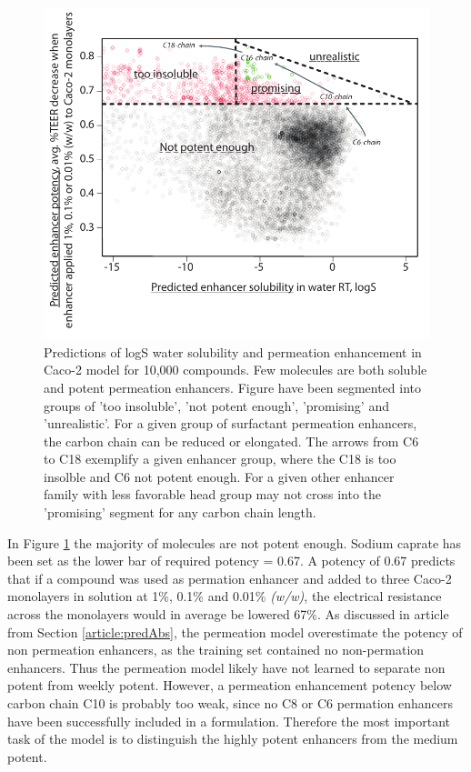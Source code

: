 \begin{figure}[!htbp]
\includegraphics[width=\textwidth,height=\textheight,keepaspectratio]{graphics/screened_molecules3.pdf}
\caption{Predictions of logS water solubility and permeation enhancement in Caco-2 model for 10,000 compounds. Few molecules are both soluble and potent permeation enhancers. Figure have been segmented into groups of 'too insoluble', 'not potent enough', 'promising' and 'unrealistic'. For a given group of surfactant permeation enhancers, the carbon chain can be reduced or elongated. The arrows from C6 to C18 exemplify a given enhancer group, where the C18 is too insolble and C6 not potent enough. For a given other enhancer family with less favorable head group may not cross into the 'promising' segment for any carbon chain length.}
\label{predictionsCombined}
\end{figure}

In Figure \ref{predictionsCombined} the majority of molecules are not potent enough. Sodium caprate has been set as the lower bar of required potency = 0.67. A potency of 0.67 predicts that if a compound was used as permation enhancer and added to three Caco-2 monolayers in solution at 1\%, 0.1\% and 0.01\% \textit{(w/w)}, the electrical resistance across the monolayers would in average be lowered 67\%. As discussed in article from Section \ref{article:predAbs}, the permeation model overestimate the potency of non permeation enhancers, as the training set contained no non-permation enhancers. Thus the permeation model likely have not learned to separate non potent from weekly potent. However, a permeation enhancement potency below carbon chain C10 is probably too weak, since no C8 or C6 permation enhancers have been successfully included in a formulation. Therefore the most important task of the model is to distinguish the highly potent enhancers from the medium potent.

